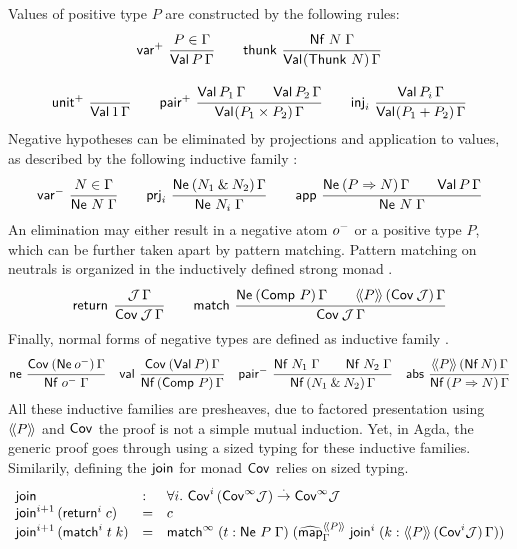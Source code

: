 \documentclass[a4paper,USenglish,cleveref, autoref]{lipics-v2019}
\begin{document}
Values 
of positive type $P$ are constructed by the
following rules:
\begin{gather*}
  \nru{\pvar}{P \in \Gamma}{\PVal P \Gamma}
\qquad
  \nru{\tthunk}{\Nf N \Gamma}{\PValP{\Thunk\,N}\Gamma}
\\[2ex]
  \nru{\punit}{}{\PVal{\tyone}\Gamma}
\qquad
  \nru{\ppair}
      {\PVal{P_1}\Gamma \qquad \PVal{P_2}\Gamma}
      {\PValP{P_1 \times P_2}\Gamma}
\qquad
  \nru{\tinj_i}{\PVal{P_i}\Gamma}{\PValP{P_1 + P_2}\Gamma}
\end{gather*}
Negative hypotheses can be eliminated by projections and application
to values, as described by the following inductive family
:
\begin{gather*}
  \nru{\nvar}{N \in \Gamma}{\Ne N \Gamma}
\qquad
  \nru{\tprj_i}
      {\NeP {N_1 \ntimes N_2} \Gamma}
      {\Ne {N_i} \Gamma}
\qquad
  \nru{\tapp}
      {\NeP {P \To N} \Gamma \qquad \PVal P \Gamma}
      {\Ne N \Gamma}
\end{gather*}
An elimination may either result in a negative atom $\natom$ or a
positive type $P$, which can be further taken apart by pattern
matching.  Pattern matching on neutrals is organized in the
inductively defined strong monad \fbox{$\Cov$}.
\begin{gather*}
  \nru{\treturn}{\J\,\Gamma}{\Cover \J \Gamma}
\qquad
  \nru{\tmatch}
      {\NeP {\Comp\,P} \Gamma \qquad \AddHypP P {\Cov\,\J} \Gamma}
      {\Cover \J \Gamma}
\end{gather*}
Finally, normal forms of negative types are defined as inductive
family .
\begin{gather*}
  \nru{\tne}
      {\CoverP {\tNe\,\natom} \Gamma}
      {\Nf {\natom} \Gamma}
\quad
  \nru{\tval}
      {\CoverP {\tVal\,P}  \Gamma}
      {\NfP {\Comp\,P} \Gamma}
\quad
  \nru{\npair}
      {\Nf {N_1} \Gamma \qquad \Nf {N_2} \Gamma}
      {\NfP {N_1 \ntimes N_2} \Gamma}
\quad
  \nru{\tabs}
      {\AddHypP P {\tNf\, N} \Gamma}
      {\NfP {P \To N} \Gamma}
\end{gather*}
All these inductive families are presheaves, due to factored
presentation using $\Add P$ and $\Cov$ the proof is not a simple
mutual induction.  Yet, in Agda, the generic proof goes through using a sized
typing for these inductive families.  Similarily, defining the
$\tjoin$ for monad $\Cov$ relies on sized typing.
\[
\begin{array}{lll}
  \tjoin & : & \forall i.\
    \Cov[i]\,(\Cov[\infty]\J) \todot \Cov[\infty]\J  \\
  \tjoin[i+1]\,(\treturn[i]\;c) & = & c \\
  \tjoin[i+1]\,(\tmatch^i\;t\;k)
    & = & \tmatch^\infty\;
     (t : \Ne P \Gamma)\;
     (\stmap[\Add P]_\Gamma\;\tjoin[i]\;(k : \AddHypP P {\Cov[i]\J} \Gamma)) \\
\end{array}
\]
\end{document}
